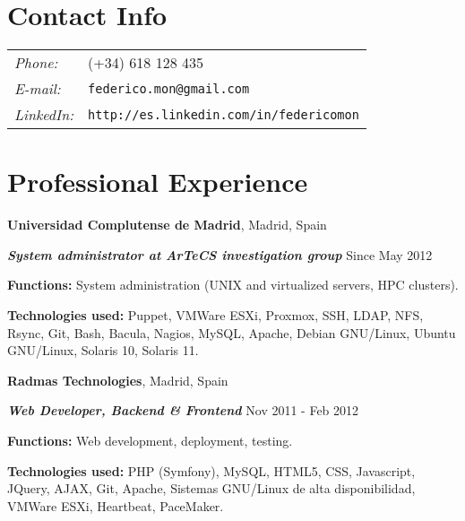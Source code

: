 \documentclass[margin,line]{resume}
\begin{document}
\address{Computer Engineer, Software Developer}

\begin{resume}
\vspace{+.2in}
\section{\sc Contact Info}
\vspace{.07in}
\begin{tabular}{@{}p{0.5in}p{2in}}
{\it Phone:} &(+34) 618 128 435 \\
{\it E-mail:} &{ \tt federico.mon@gmail.com}\\
{\it LinkedIn:} &{ \tt http://es.linkedin.com/in/federicomon}\\
\end{tabular}

\vspace{+.2in}
\section{\sc Professional Experience}
{\bf Universidad Complutense de Madrid}, Madrid, Spain

\vspace{-.2cm}
{\bf \em System administrator at ArTeCS investigation group} \hfill
{ Since May 2012
}
\begin{list2}
\vspace*{.06in}
\item {\bf Functions: }{System administration (UNIX and virtualized 
        servers, HPC clusters).}
\item {\bf Technologies used: }{Puppet, VMWare ESXi, Proxmox,
        SSH, LDAP, NFS, Rsync, Git,
        Bash, Bacula, Nagios, MySQL, Apache, 
        Debian GNU/Linux, Ubuntu GNU/Linux, 
        Solaris 10, Solaris 11.}
\end{list2}

\vspace{+.05in}
{\bf Radmas Technologies}, Madrid, Spain

\vspace{-.2cm}
{\bf \em Web Developer, Backend \& Frontend} \hfill
{ Nov 2011 - Feb 2012
}

\begin{list2}
\vspace*{.06in}
\item {\bf Functions: }{Web development, deployment, testing.}
\item {\bf Technologies used: }{PHP (Symfony), MySQL, HTML5, CSS,
Javascript, JQuery, AJAX, Git, Apache, Sistemas GNU/Linux de alta
disponibilidad, VMWare ESXi, Heartbeat, PaceMaker.}
\end{list2}


\end{resume}
\end{document}
